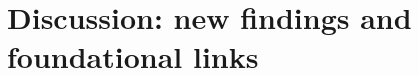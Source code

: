 \documentclass[]{agujournal2018}
\begin{document}

\section{Discussion: new findings and foundational links}
\label{sec:discussion}
\end{document}

